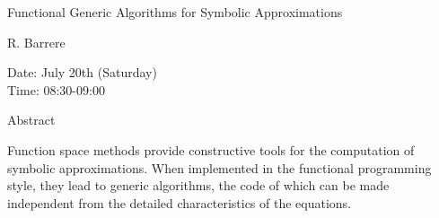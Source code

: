 \begin{center}
\LARGE
Functional Generic Algorithms for Symbolic
                        Approximations
\end{center}

\begin{center}
\Large
R. Barrere

\end{center}

\noindent
Date:  July 20th (Saturday)\\
Time:  08:30-09:00\\

\begin{center}
\large
Abstract
\end{center}

Function space methods provide constructive tools for the computation of symbolic
approximations. When implemented in the functional programming style, they lead to generic
algorithms, the code of which can be made independent from the detailed characteristics of the
equations. 

